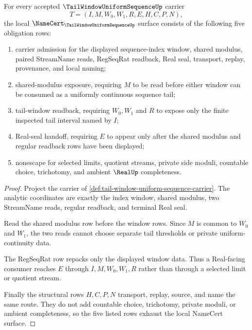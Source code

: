 \begin{theorem}
\label{thm:tail-window-uniform-sequence-obligations}
For every accepted $\TailWindowUniformSequenceUp$ carrier
$$
T=(I,M,W_0,W_1,R,E,H,C,P,N),
$$
the local $\NameCert_{\TailWindowUniformSequenceUp}$ surface consists of the following five obligation rows:
\begin{enumerate}
\item carrier admission for the displayed sequence-index window, shared modulus, paired StreamName reads, RegSeqRat readback, Real seal, transport, replay, provenance, and local naming;
\item shared-modulus exposure, requiring $M$ to be read before either window can be consumed as a uniformly continuous sequence tail;
\item tail-window readback, requiring $W_0,W_1$ and $R$ to expose only the finite inspected tail interval named by $I$;
\item Real-seal handoff, requiring $E$ to appear only after the shared modulus and regular readback rows have been displayed;
\item nonescape for selected limits, quotient streams, private side moduli, countable choice, trichotomy, and ambient $\RealUp$ completeness.
\end{enumerate}
\end{theorem}
\begin{proof}
Project the carrier of \autoref{def:tail-window-uniform-sequence-carrier}. The analytic coordinates are exactly the index window, shared modulus, two StreamName reads, regular readback, and terminal Real seal.

Read the shared modulus row before the window rows. Since $M$ is common to $W_0$ and $W_1$, the two reads cannot choose separate tail thresholds or private uniform-continuity data.

The RegSeqRat row repacks only the displayed window data. Thus a Real-facing consumer reaches $E$ through $I,M,W_0,W_1,R$ rather than through a selected limit or quotient stream.

Finally the structural rows $H,C,P,N$ transport, replay, source, and name the same route. They do not add countable choice, trichotomy, private moduli, or ambient completeness, so the five listed rows exhaust the local NameCert surface.
\end{proof}


